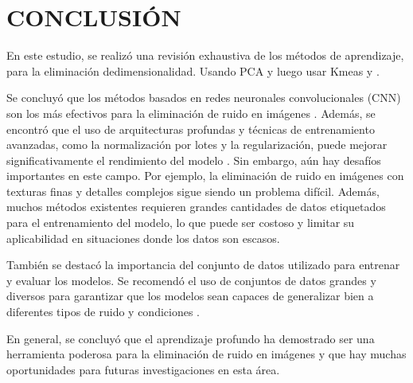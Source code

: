 \documentclass[a4paper,
               ]{jacow}
\begin{document}
\section{CONCLUSIÓN}

En este estudio, se realizó una revisión exhaustiva de los métodos de aprendizaje, para la eliminación dedimensionalidad. Usando PCA y luego usar Kmeas y .

Se concluyó que los métodos basados en redes neuronales convolucionales (CNN) son los más efectivos para la eliminación de ruido en imágenes \cite{zhang2017beyond, lehtinen2018noise2noise, tai2017image}. Además, se encontró que el uso de arquitecturas profundas y técnicas de entrenamiento avanzadas, como la normalización por lotes y la regularización, puede mejorar significativamente el rendimiento del modelo \cite{lefkimmiatis2018universal}. Sin embargo, aún hay desafíos importantes en este campo. Por ejemplo, la eliminación de ruido en imágenes con texturas finas y detalles complejos sigue siendo un problema difícil. Además, muchos métodos existentes requieren grandes cantidades de datos etiquetados para el entrenamiento del modelo, lo que puede ser costoso y limitar su aplicabilidad en situaciones donde los datos son escasos.

También se destacó la importancia del conjunto de datos utilizado para entrenar y evaluar los modelos. Se recomendó el uso de conjuntos de datos grandes y diversos para garantizar que los modelos sean capaces de generalizar bien a diferentes tipos de ruido y condiciones \cite{zhang2018learning}.

En general, se concluyó que el aprendizaje profundo ha demostrado ser una herramienta poderosa para la eliminación de ruido en imágenes y que hay muchas oportunidades para futuras investigaciones en esta área.
\end{document}
